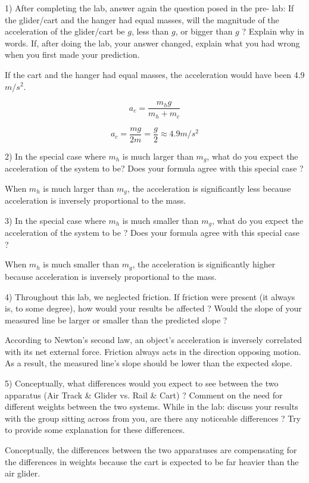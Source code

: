 

{1) After completing the lab, answer again the question posed in the pre- lab: If the glider/cart and the hanger had equal masses, will the magnitude of the acceleration of the glider/cart be $g$, less than $g$, or bigger than $g$ ? Explain why in words. If, after doing the lab, your answer changed, explain what you had wrong when you first made your prediction.}

{If the cart and the hanger had equal masses, the acceleration would have been 4.9 $m/s^2$.}

	$$a_{c} = \frac{m_{h}g}{m_{h} + m_{c}}$$
	
	$$a_{c} = \frac{mg}{2m} = \frac{g}{2} \approx 4.9 m/s^2$$

{2) In the special case where $m_{h}$ is much larger than $m_{g}$, what do you expect the acceleration of the system to be? Does your formula agree with this special case ?}

{When $m_{h}$ is much larger than $m_{g}$, the acceleration is significantly less because acceleration is inversely proportional to the mass.}

{3) In the special case where $m_{h}$ is much smaller than $m_{g}$, what do you expect the acceleration of the system to be ? Does your formula agree with this special case ?}

{When $m_{h}$ is much smaller than $m_{g}$, the acceleration is significantly higher because acceleration is inversely proportional to the mass.}

{4) Throughout this lab, we neglected friction. If friction were present (it always is, to some degree), how would your results be affected ? Would the slope of your measured line be larger or smaller than the predicted slope ?}

{According to Newton's second law, an object's acceleration is inversely correlated with its net external force. Friction always acts in the direction opposing motion. As a result, the measured line's slope should be lower than the expected slope.}

{5) Conceptually, what differences would you expect to see between the two apparatus (Air Track & Glider vs. Rail & Cart) ? Comment on the need for different weights between the two systems. While in the lab: discuss your results with the group sitting across from you, are there any noticeable differences ? Try to provide some explanation for these differences.}

{Conceptually, the differences between the two apparatuses are compensating for the differences in weights because the cart is expected to be far heavier than the air glider.}


